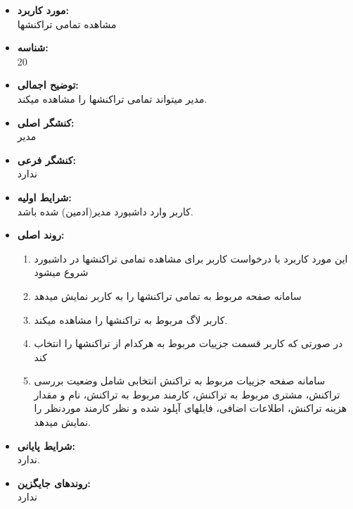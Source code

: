 \documentclass{article}
\begin{document}
\begin{itemize}
\item \textbf{مورد کاربرد:}\\
مشاهده تمامی تراکنشها
\item \textbf{شناسه:}\\
20
\item \textbf{توضیح اجمالی:}\\
مدیر میتواند تمامی تراکنشها را مشاهده میکند.
\item \textbf{کنشگر اصلی:}\\
مدیر
\item \textbf{کنشگر فرعی:}\\
ندارد
\item \textbf{شرایط اولیه:}\\
کاربر وارد داشبورد مدیر(ادمین) شده باشد.
\item \textbf{روند اصلی:}\\
\begin{enumerate}
\item  این مورد کاربرد با درخواست کاربر برای مشاهده تمامی تراکنشها در داشبورد شروع میشود
\item سامانه صفحه مربوط به تمامی تراکنشها را به کاربر نمایش میدهد
\item کاربر لاگ مربوط به تراکنشها را مشاهده میکند.
\item  در صورتی که کاربر قسمت جزییات مربوط به هرکدام از تراکنشها را انتخاب کند
\item سامانه صفحه جزییات مربوط به تراکنش انتخابی شامل وضعیت بررسی تراکنش، مشتری مربوط به تراکنش، کارمند مربوط به تراکنش، نام و مقدار هزینه تراکنش، اطلاعات اضافی، فایلهای آپلود شده و نظر کارمند موردنظر را نمایش میدهد.
\end{enumerate}
\item \textbf{شرایط پایانی:}\\ 
ندارد.
\item \textbf{روندهای جایگزین:}\\
ندارد
\end{itemize}
\noindent\makebox[\linewidth]{\rule{\paperwidth}{0.4pt}}
\end{document}

